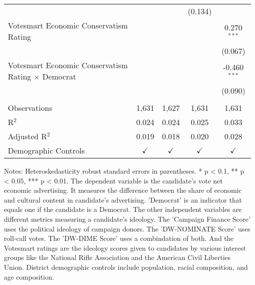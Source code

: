 \begin{table}[htbp]
\begin{tabular}{lcccc}
                                                                &                &                & (0.134)        &   \\   
      Votesmart Economic Conservatism Rating                    &                &                &                & 0.270$^{***}$\\   
                                                                &                &                &                & (0.067)\\   
      Votesmart Economic Conservatism Rating $\times$ Democrat  &                &                &                & -0.460$^{***}$\\   
                                                                &                &                &                & (0.090)\\   
       \\
      Observations                                              & 1,631          & 1,627          & 1,631          & 1,631\\  
      R$^2$                                                     & 0.024          & 0.024          & 0.025          & 0.033\\  
      Adjusted R$^2$                                            & 0.019          & 0.018          & 0.020          & 0.028\\  
      Demographic Controls                                      & $\checkmark$   & $\checkmark$   & $\checkmark$   & $\checkmark$\\   
      \bottomrule
   \end{tabular}
   
   \par \raggedright 
   \footnotesize Notes: Heteroskedasticity robust standard errors in parentheses. * p < 0.1, ** p < 0.05, *** p < 0.01.  The dependent variable is the candidate's vote net economic advertising. It measures the difference between the share of economic and cultural content in candidate's advertising. 'Democrat' is an indicator that equals one if the candidate is a Democrat. The other independent variables are different metrics measuring a candidate's ideology. The 'Campaign Finance Score' uses the political ideology of campaign donors. The 'DW-NOMINATE Score' uses roll-call votes. The 'DW-DIME Score' uses a combindation of both. And the Votesmart ratings are the ideology scores given to candidates by various interest groups like the National Rifle Association and the American Civil Liberties Union. District demographic controls include population, racial composition, and age composition.
\end{table}


